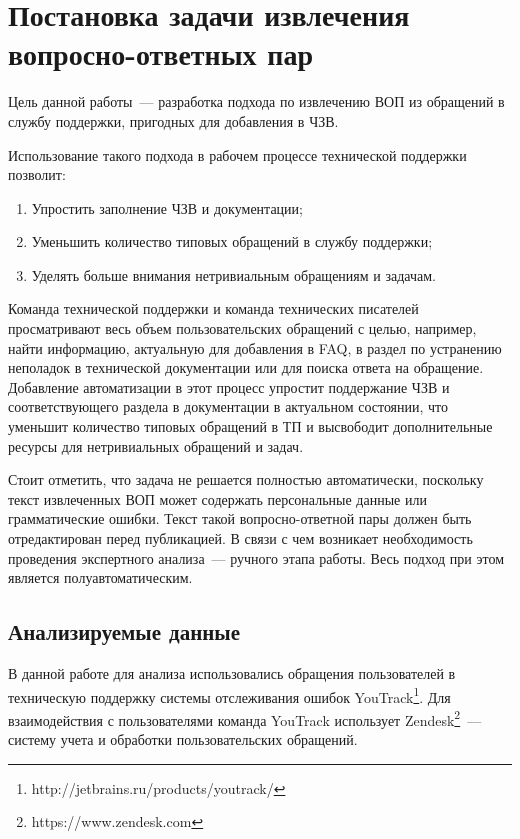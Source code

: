 \chapter{Постановка задачи извлечения вопросно-ответных пар}
\label{chap:task}

Цель данной работы~--- разработка подхода по извлечению ВОП из обращений в службу поддержки, пригодных для добавления в ЧЗВ. 

Использование такого подхода в рабочем процессе технической поддержки позволит:

\begin{enumerate}
\item Упростить заполнение ЧЗВ и документации;
\item Уменьшить количество типовых обращений в службу поддержки;
\item Уделять больше внимания нетривиальным обращениям и задачам.
\end{enumerate}

Команда технической поддержки и команда технических писателей просматривают весь объем пользовательских обращений с целью, например, найти информацию, актуальную для добавления в FAQ, в раздел по устранению неполадок в технической документации или для поиска ответа на обращение. Добавление автоматизации в этот процесс упростит поддержание ЧЗВ и соответствующего раздела в документации в актуальном состоянии, что уменьшит количество типовых обращений в ТП и высвободит дополнительные ресурсы для нетривиальных обращений и задач. 

Стоит отметить, что задача не решается полностью автоматически, поскольку текст извлеченных ВОП может содержать персональные данные или грамматические ошибки. Текст такой вопросно-ответной пары должен быть отредактирован перед публикацией. В связи с чем возникает необходимость проведения экспертного анализа~--- ручного этапа работы. Весь подход при этом является полуавтоматическим.

\section{Анализируемые данные}
\label{sec:data}
В данной работе для анализа использовались обращения пользователей в техническую поддержку системы отслеживания ошибок YouTrack\footnote{http://jetbrains.ru/products/youtrack/}. Для взаимодействия с пользователями команда YouTrack использует Zendesk\footnote{https://www.zendesk.com}~--- систему учета и обработки пользовательских обращений.

